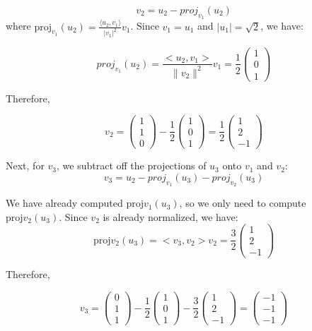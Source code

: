 \documentclass[fontsize=12pt]{scrartcl}
\begin{document}
$$v_2 = u_2 - proj_{v_1}(u_2) $$
\noindent
where $\text{proj}_{v_1}(u_2) = \frac{\langle u_2, v_1 \rangle}{|v_1|^2} v_1$. Since $v_1 = u_1$ and $|u_1| = \sqrt{2}$, we have:

$$proj_{v_1}(u_2) = \frac{<u_2, v_1>}{\|v_2\|^2}v_1 = \frac{1}{2}\left(\begin{array}{c} 1 \\ 0 \\ 1 \end{array} \right) $$

\noindent
Therefore,

$$v_2 = \left(\begin{array}{c} 1 \\ 1 \\ 0 \end{array} \right) - \frac{1}{2}\left(\begin{array}{c} 1 \\ 0 \\ 1 \end{array} \right) = \frac{1}{2}\left(\begin{array}{c} 1 \\ 2 \\ -1 \end{array} \right) $$

\noindent
Next, for $v_3$, we subtract off the projections of $u_3$ onto $v_1$ and $v_2$:
$$v_3 = u_2 - proj_{v_1}(u_3) - proj_{v_2}(u_3)$$

\noindent
We have already computed $\text{proj}{v_1}(u_3)$, so we only need to compute $\text{proj}{v_2}(u_3)$. Since $v_2$ is already normalized, we have:
$$\text{proj}{v_2}(u_3) = <v_3, v_2>v_2 = \frac{3}{2}\left(\begin{array}{c} 1 \\ 2 \\ -1 \end{array} \right) $$

\noindent
Therefore,

$$v_3 =  \left(\begin{array}{c} 0 \\ 1 \\ 1 \end{array} \right) - \frac{1}{2}\left(\begin{array}{c} 1 \\ 0 \\ 1 \end{array} \right) - \frac{3}{2}\left(\begin{array}{c} 1 \\ 2 \\ -1 \end{array} \right) = \left(\begin{array}{c} -1 \\ -1 \\ -1 \end{array} \right)$$
\end{document}
